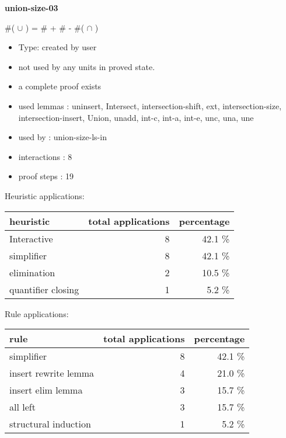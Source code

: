 \documentclass[a4paper]{article}
\begin{document}
{\LARGE\bf union-size-03}\label{lemma-union-size-03}

\medskip

 \Fol \#( $\cup$ ) = \#  + \#  - \#( $\cap$ )

\begin{itemize}

\item Type: created by user

\item not used by any units in proved state.
\item       a complete proof exists
\item       used lemmas  : uninsert, Intersect, intersection-shift, ext, intersection-size, intersection-insert, Union, unadd, int-c, int-a, int-e, unc, una, une
\item       used by      : union-size-ls-in
\item       interactions : 8
\item       proof steps  : 19
\end{itemize}

\medskip


Heuristic applications:

\begin{supertabular}{l|r|r}
heuristic	& total applications & percentage \\ \hline
Interactive & 8 & 42.1 \% \\
simplifier & 8 & 42.1 \% \\
elimination & 2 & 10.5 \% \\
quantifier closing & 1 & 5.2 \% \\

\end{supertabular}

Rule applications:

\begin{supertabular}{l|r|r}
rule	        & total applications & percentage \\ \hline
simplifier & 8 & 42.1 \% \\
insert rewrite lemma & 4 & 21.0 \% \\
insert elim lemma & 3 & 15.7 \% \\
all left & 3 & 15.7 \% \\
structural induction & 1 & 5.2 \% \\

\end{supertabular}
\end{document}
